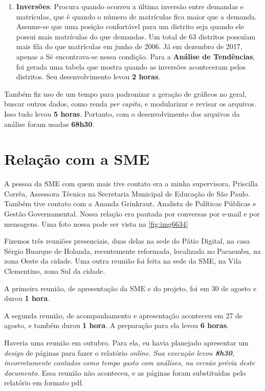 \documentclass[12pt, a4paper]{article}
\begin{document}
\begin{enumerate}
	\item \textbf{Inversões}: Procura quando ocorreu a última inversão entre demandas e matrículas, que é quando o número de matrículas fica maior que a demanda. Assume-se que uma posição confortável para um distrito seja quando ele possui mais matrículas do que demandas. Um total de 63 distritos possuíam mais fila do que matrículas em junho de 2006. Já em dezembro de 2017, apenas a Sé encontrava-se nessa condição. Para a \textbf{Análise de Tendências}, foi gerada uma tabela que mostra quando as inversões aconteceram pelos distritos. Seu desenvolvimento levou \textbf{2 horas}.
\end{enumerate}

Também fiz uso de um tempo para padronizar a geração de gráficos no geral, buscar outros dados, como renda \textit{per capita}, e modularizar e revisar os arquivos. Isso tudo levou \textbf{5 horas}. Portanto, com o desenvolvimento dos arquivos da análise foram usadas \textbf{68h30}.  

\section{Relação com a SME}

A pessoa da SME com quem mais tive contato era a minha supervisora, Priscilla Corrêa, Assessora Técnica na Secretaria Municipal de Educação de São Paulo. Também tive contato com a Ananda Grinkraut, Analista de Políticas Públicas e Gestão Governamental. Nossa relação era pautada por conversas por e-mail e por mensagens. Uma foto nossa pode ser vista na \autoref{fig:img6634}

Fizemos três reuniões presenciais, duas delas na sede do Pátio Digital, na casa Sérgio Buarque de Holanda, recentemente reformada, localizada no Pacaembu, na zona Oeste da cidade. Uma outra reunião foi feita na sede da SME, na Vila Clementino, zona Sul da cidade.

A primeira reunião, de apresentação da SME e do projeto, foi em 30 de agosto e durou \textbf{1 hora}.

A segunda reunião, de acompanhamento e apresentação aconteceu em 27 de agosto, e também durou \textbf{1 hora}. A preparação para ela levou \textbf{6 horas}.

Haveria uma reunião em outubro. Para ela, eu havia planejado apresentar um \textit{design} de páginas para fazer o relatório \textit{online}. \textit{Sua execução levou \textbf{8h30}, incorretamente contados como tempo gasto com análises, na versão prévia deste documento}. Essa reunião não aconteceu, e as páginas foram substituídas pelo relatório em formato pdf.
\end{document}

